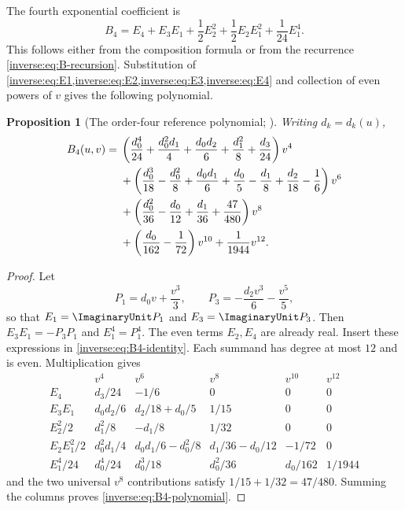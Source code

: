 \documentclass[11pt,oneside]{article}
\newtheorem{proposition}[proposition]{Proposition}
\theoremstyle{definition}
\theoremstyle{remark}
\begin{document}
The fourth exponential coefficient is
\begin{equation}
 B_4
 =E_4+E_3E_1+\frac12E_2^2
   +\frac12E_2E_1^2+\frac1{24}E_1^4.
 \label{inverse:eq:B4-identity}
\end{equation}
This follows either from the composition formula or from the recurrence
\eqref{inverse:eq:B-recursion}.  Substitution of
\cref{inverse:eq:E1,inverse:eq:E2,inverse:eq:E3,inverse:eq:E4} and collection of even powers of $v$
gives the following polynomial.

\begin{proposition}[The order-four reference polynomial; \Formalized]
\label{inverse:prop:B4-polynomial}
Writing $d_k=d_k(u)$,
\begin{align}
 B_4(u,v)={}&
 \left(\frac{d_0^4}{24}+\frac{d_0^2d_1}{4}
       +\frac{d_0d_2}{6}+\frac{d_1^2}{8}
       +\frac{d_3}{24}\right)v^4 \notag\\
 &+\left(\frac{d_0^3}{18}-\frac{d_0^2}{8}
       +\frac{d_0d_1}{6}+\frac{d_0}{5}
       -\frac{d_1}{8}+\frac{d_2}{18}
       -\frac16\right)v^6 \notag\\
 &+\left(\frac{d_0^2}{36}-\frac{d_0}{12}
       +\frac{d_1}{36}+\frac{47}{480}\right)v^8 \notag\\
 &+\left(\frac{d_0}{162}-\frac1{72}\right)v^{10}
   +\frac1{1944}v^{12}. \label{inverse:eq:B4-polynomial}
\end{align}
\end{proposition}

\begin{proof}
Let
\[
 P_1=d_0v+\frac{v^3}{3},\qquad
 P_3=-\frac{d_2v^3}{6}-\frac{v^5}{5},
\]
so that $E_1=\ImaginaryUnit P_1$ and $E_3=\ImaginaryUnit P_3$.  Then
$E_3E_1=-P_3P_1$ and $E_1^4=P_1^4$.  The even terms $E_2,E_4$ are already
real.  Insert these expressions in \eqref{inverse:eq:B4-identity}.  Each summand
has degree at most $12$ and is even.  Multiplication gives
\[
\begin{array}{c|ccccc}
 &v^4&v^6&v^8&v^{10}&v^{12}\\
\hline
E_4&
 d_3/24&-1/6&0&0&0\\
E_3E_1&
 d_0d_2/6&d_2/18+d_0/5&1/15&0&0\\
E_2^2/2&
 d_1^2/8&-d_1/8&1/32&0&0\\
E_2E_1^2/2&
 d_0^2d_1/4&
 d_0d_1/6-d_0^2/8&
 d_1/36-d_0/12&
 -1/72&0\\
E_1^4/24&
 d_0^4/24&d_0^3/18&d_0^2/36&d_0/162&1/1944
\end{array}
\]
and the two universal $v^8$ contributions satisfy
$1/15+1/32=47/480$.  Summing the columns proves
\eqref{inverse:eq:B4-polynomial}.
\end{proof}
\end{document}
